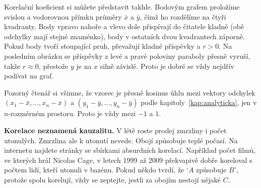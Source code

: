 \begin{center}
\end{center}
Korelační koeficient si můžete představit takhle. Bodovým grafem proložíme svislou a vodorovnou přímku průměry $\bar{x}$ a $\bar{y}$, čímž ho rozdělíme na čtyři kvadranty. Body vpravo nahoře a vlevo dole přispívají do čitatele kladně (obě odchylky mají stejné znaménko), body v ostatních dvou kvadrantech záporně. Pokud body tvoří stoupající pruh, převažují kladné příspěvky a $r > 0$. Na posledním obrázku se příspěvky z levé a pravé poloviny paraboly přesně vyruší, takže $r\approx 0$, přestože $y$ je na $x$ silně závislé. Proto je dobré se vždy nejdřív podívat na graf.

Pozorný čtenář si všimne, že vzorec je přesně kosinus úhlu mezi vektory odchylek $(x_1 - \bar{x}, \ldots, x_n - \bar{x})$ a $(y_1 - \bar{y}, \ldots, y_n - \bar{y})$ podle kapitoly~\ref{kap:analyticka}, jen v $n$-rozměrném prostoru. Proto je vždy mezi $-1$ a $1$.

\begin{note}
  \textbf{Korelace neznamená kauzalitu.} V létě roste prodej zmrzliny i počet utonulých. Zmrzlina ale k utonutí nevede. Obojí způsobuje teplé počasí. Na internetu najdete stránky se sbírkami absurdních korelací. Například počet filmů, ve kterých hrál Nicolas Cage, v letech 1999 až 2009 překvapivě dobře koreloval s počtem lidí, kteří utonuli v bazénu. Pokud někdo tvrdí, že `$A$ způsobuje $B$', protože spolu korelují, vždy se zeptejte, jestli za obojím nestojí nějaké $C$.
\end{note}

